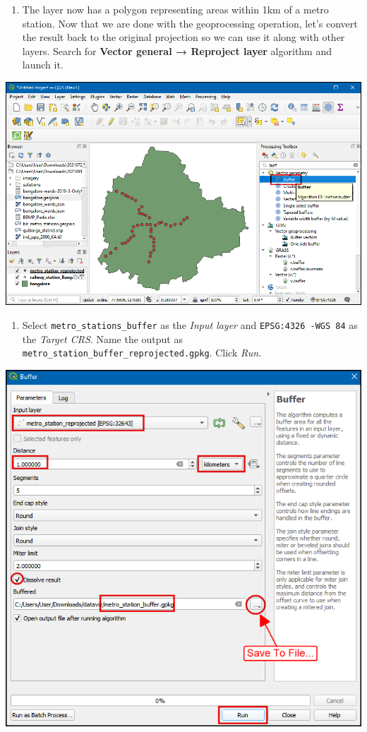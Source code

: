 \documentclass[
  12pt,
  a4paper]{article}
\providecommand{\tightlist}{%
  \setlength{\itemsep}{0pt}\setlength{\parskip}{0pt}}
\begin{document}
\begin{enumerate}
\def\labelenumi{\arabic{enumi}.}
\setcounter{enumi}{8}
\tightlist
\item
  The layer now has a polygon representing areas within 1km of a metro
  station. Now that we are done with the geoprocessing operation, let's
  convert the result back to the original projection so we can use it
  along with other layers. Search for \textbf{Vector general → Reproject
  layer} algorithm and launch it.
\end{enumerate}

\begin{center}\includegraphics[width=0.75\linewidth]{images/spatial_data_viz/pop9} \end{center}

\begin{enumerate}
\def\labelenumi{\arabic{enumi}.}
\setcounter{enumi}{9}
\tightlist
\item
  Select \texttt{metro\_stations\_buffer} as the \emph{Input layer} and
  \texttt{EPSG:4326\ -WGS\ 84} as the \emph{Target CRS}. Name the output
  as \texttt{metro\_station\_buffer\_reprojected.gpkg}. Click
  \emph{Run}.
\end{enumerate}

\begin{center}\includegraphics[width=0.75\linewidth]{images/spatial_data_viz/pop10} \end{center}
\end{document}
